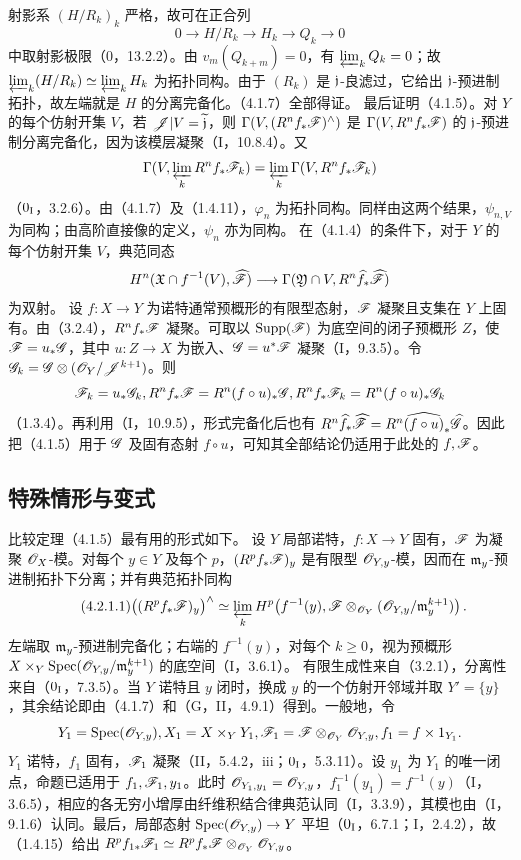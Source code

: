 射影系 $(H/R_k)_k$ 严格，故可在正合列
\begin{equation}\tag{4.1.7.22}0\to H/R_k\to H_k\to Q_k\to0\end{equation}
中取射影极限（0，13.2.2）。由 $v_m(Q_{k+m})=0$，有 $\varprojlim_kQ_k=0$；故 $\varprojlim_k(H/R_k)\simeq\varprojlim_kH_k$ 为拓扑同构。由于 $(R_k)$ 是 $\mathfrak j$-良滤过，它给出 $\mathfrak j$-预进制拓扑，故左端就是 $H$ 的分离完备化。（4.1.7）全部得证。\finishproof
{}
最后证明（4.1.5）。对 $Y$ 的每个仿射开集 $V$，若 $\mathscr J|V=\widetilde{\mathfrak j}$，则 $\Gamma(V,(R^nf_*\mathscr F)^\wedge)$ 是 $\Gamma(V,R^nf_*\mathscr F)$ 的 $\mathfrak j$-预进制分离完备化，因为该模层凝聚（I，10.8.4）。又
\[
\Gamma(V,\varprojlim_kR^nf_*\mathscr F_k)=\varprojlim_k\Gamma(V,R^nf_*\mathscr F_k)
\]
（$0_{\mathrm I}$，3.2.6）。由（4.1.7）及（1.4.11），$\varphi_n$ 为拓扑同构。同样由这两个结果，$\psi_{n,V}$ 为同构；由高阶直接像的定义，$\psi_n$ 亦为同构。
在（4.1.4）的条件下，对于 $Y$ 的每个仿射开集 $V$，典范同态
\[
H^n(\mathfrak X\cap f^{-1}(V),\widehat{\mathscr F})
\longrightarrow\Gamma(\mathfrak Y\cap V,R^n\widehat f_*\widehat{\mathscr F})
\]
为双射。
设 $f:X\to Y$ 为诺特通常预概形的有限型态射，$\mathscr F$ 凝聚且支集在 $Y$ 上固有。由（3.2.4），$R^nf_*\mathscr F$ 凝聚。可取以 $\operatorname{Supp}(\mathscr F)$ 为底空间的闭子预概形 $Z$，使 $\mathscr F=u_*\mathscr G$，其中 $u:Z\to X$ 为嵌入、$\mathscr G=u^*\mathscr F$ 凝聚（I，9.3.5）。令 $\mathscr G_k=\mathscr G\otimes(\mathscr O_Y/\mathscr J^{k+1})$。则
\[
\mathscr F_k=u_*\mathscr G_k, R^nf_*\mathscr F=R^n(f\circ u)_*\mathscr G,
 R^nf_*\mathscr F_k=R^n(f\circ u)_*\mathscr G_k
\]
（1.3.4）。再利用（I，10.9.5），形式完备化后也有 $R^n\widehat f_*\widehat{\mathscr F}=R^n\widehat{(f\circ u)}_*\widehat{\mathscr G}$。因此把（4.1.5）用于 $\mathscr G$ 及固有态射 $f\circ u$，可知其全部结论仍适用于此处的 $f,\mathscr F$。\par

\subsection{特殊情形与变式}
比较定理（4.1.5）最有用的形式如下。
设 $Y$ 局部诺特，$f:X\to Y$ 固有，$\mathscr F$ 为凝聚 $\mathscr O_X$-模。对每个 $y\in Y$ 及每个 $p$，$(R^pf_*\mathscr F)_y$ 是有限型 $\mathscr O_{Y,y}$-模，因而在 $\mathfrak m_y$-预进制拓扑下分离；并有典范拓扑同构
\begin{equation}\tag{4.2.1.1}
\bigl((R^pf_*\mathscr F)_y\bigr)^\wedge
\simeq\varprojlim_kH^p\!\left(f^{-1}(y),\mathscr F\otimes_{\mathscr O_Y}(\mathscr O_{Y,y}/\mathfrak m_y^{k+1})\right).
\end{equation}
左端取 $\mathfrak m_y$-预进制完备化；右端的 $f^{-1}(y)$，对每个 $k\ge0$，视为预概形 $X\times_Y\operatorname{Spec}(\mathscr O_{Y,y}/\mathfrak m_y^{k+1})$ 的底空间（I，3.6.1）。
\eproof
有限生成性来自（3.2.1），分离性来自（$0_{\mathrm I}$，7.3.5）。当 $Y$ 诺特且 $y$ 闭时，换成 $y$ 的一个仿射开邻域并取 $Y'=\{y\}$，其余结论即由（4.1.7）和（G，II，4.9.1）得到。一般地，令
\[
Y_1=\operatorname{Spec}(\mathscr O_{Y,y}), X_1=X\times_YY_1,
\mathscr F_1=\mathscr F\otimes_{\mathscr O_Y}\mathscr O_{Y,y}, f_1=f\times1_{Y_1}.
\]
$Y_1$ 诺特，$f_1$ 固有，$\mathscr F_1$ 凝聚（II，5.4.2，iii；$0_{\mathrm I}$，5.3.11）。设 $y_1$ 为 $Y_1$ 的唯一闭点，命题已适用于 $f_1,\mathscr F_1,y_1$。此时 $\mathscr O_{Y_1,y_1}=\mathscr O_{Y,y}$，$f_1^{-1}(y_1)=f^{-1}(y)$（I，3.6.5），相应的各无穷小增厚由纤维积结合律典范认同（I，3.3.9），其模也由（I，9.1.6）认同。最后，局部态射 $\operatorname{Spec}(\mathscr O_{Y,y})\to Y$ 平坦（$0_{\mathrm I}$，6.7.1；I，2.4.2），故（1.4.15）给出 $R^pf_{1*}\mathscr F_1\simeq R^pf_*\mathscr F\otimes_{\mathscr O_Y}\mathscr O_{Y,y}$。\finishproof

